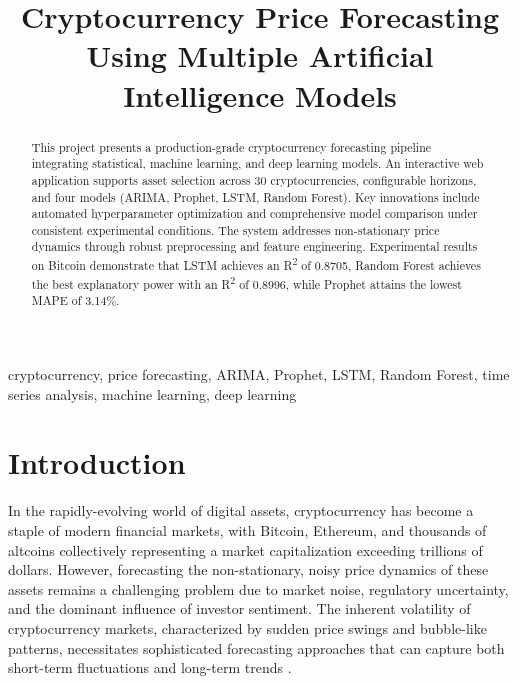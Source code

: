\documentclass[conference]{IEEEtran}
\begin{document}
\title{Cryptocurrency Price Forecasting Using Multiple Artificial Intelligence Models}

\author{
}

\maketitle


\begin{abstract}
This project presents a production-grade cryptocurrency forecasting pipeline integrating statistical, machine learning, and deep learning models. An interactive web application supports asset selection across 30 cryptocurrencies, configurable horizons, and four models (ARIMA, Prophet, LSTM, Random Forest). Key innovations include automated hyperparameter optimization and comprehensive model comparison under consistent experimental conditions. The system addresses non-stationary price dynamics through robust preprocessing and feature engineering. Experimental results on Bitcoin demonstrate that LSTM achieves an R\textsuperscript{2} of 0.8705, Random Forest achieves the best explanatory power with an R\textsuperscript{2} of 0.8996, while Prophet attains the lowest MAPE of 3.14\%.
\end{abstract}

\begin{IEEEkeywords}
cryptocurrency, price forecasting, ARIMA, Prophet, LSTM, Random Forest, time series analysis, machine learning, deep learning
\end{IEEEkeywords}


\section{Introduction}

In the rapidly-evolving world of digital assets, cryptocurrency has become a staple of modern financial markets, with Bitcoin, Ethereum, and thousands of altcoins collectively representing a market capitalization exceeding trillions of dollars. However, forecasting the non-stationary, noisy price dynamics of these assets remains a challenging problem due to market noise, regulatory uncertainty, and the dominant influence of investor sentiment. The inherent volatility of cryptocurrency markets, characterized by sudden price swings and bubble-like patterns, necessitates sophisticated forecasting approaches that can capture both short-term fluctuations and long-term trends \cite{ren2022, fang2022}.
\end{document}
